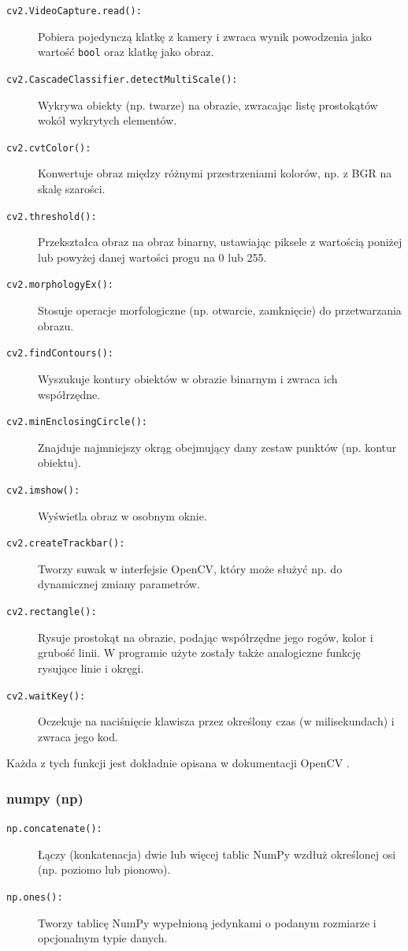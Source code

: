 \documentclass[a4paper,twoside,12pt]{book}
\begin{document}
\begin{description} 
	\item[\texttt{cv2.VideoCapture.read():}] Pobiera pojedynczą klatkę z kamery i zwraca wynik powodzenia jako wartość \texttt{bool} oraz klatkę jako obraz.
	\item[\texttt{cv2.CascadeClassifier.detectMultiScale():}] Wykrywa obiekty (np. twarze) na obrazie, zwracając listę prostokątów wokół wykrytych elementów.
	\item[\texttt{cv2.cvtColor():}] Konwertuje obraz między różnymi przestrzeniami kolorów, np. z BGR na skalę szarości.
	\item[\texttt{cv2.threshold():}] Przekształca obraz na obraz binarny, ustawiając piksele z wartością poniżej lub powyżej danej wartości progu na 0 lub 255.
	\item[\texttt{cv2.morphologyEx():}] Stosuje operacje morfologiczne (np. otwarcie, zamknięcie) do przetwarzania obrazu.
	\item[\texttt{cv2.findContours():}] Wyszukuje kontury obiektów w obrazie binarnym i zwraca ich współrzędne.
	\item[\texttt{cv2.minEnclosingCircle():}] Znajduje najmniejszy okrąg obejmujący dany zestaw punktów (np. kontur obiektu).
	\item[\texttt{cv2.imshow():}] Wyświetla obraz w osobnym oknie.
	\item[\texttt{cv2.createTrackbar():}] Tworzy suwak w interfejsie OpenCV, który może służyć np. do dynamicznej zmiany parametrów.
	\item[\texttt{cv2.rectangle():}] Rysuje prostokąt na obrazie, podając współrzędne jego rogów, kolor i grubość linii. W programie użyte zostały także analogiczne funkcję rysujące linie i okręgi.
	\item[\texttt{cv2.waitKey():}] Oczekuje na naciśnięcie klawisza przez określony czas (w milisekundach) i zwraca jego kod.
\end{description}

Każda z tych funkcji jest dokładnie opisana w dokumentacji OpenCV \cite{bib:OpenCV-funkcje}.

\subsubsection{numpy (np)}

\begin{description}
	\item[\texttt{np.concatenate():}] Łączy (konkatenacja) dwie lub więcej tablic NumPy wzdłuż określonej osi (np. poziomo lub pionowo).
	\item[\texttt{np.ones():}] Tworzy tablicę NumPy wypełnioną jedynkami o podanym rozmiarze i opcjonalnym typie danych. 
\end{description}
\end{document}
